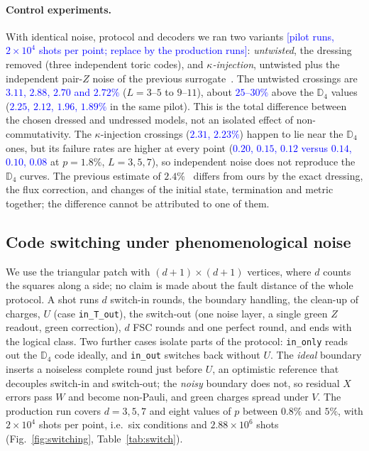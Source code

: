 \documentclass[a4paper]{article}
\newcommand{\blue}[1]{\textcolor{blue}{#1}}
\newcommand{\cs}[1]{\texttt{#1}}
\begin{document}
\paragraph{Control experiments.}
With identical noise, protocol and decoders we ran two variants \blue{[pilot runs, $2\times10^4$ shots per point; replace by the production runs]}: \emph{untwisted}, the dressing removed (three independent toric codes), and \emph{$\kappa$-injection}, untwisted plus the independent pair-$Z$ noise of the previous surrogate~\cite{haga2026aqis}. The untwisted crossings are \blue{$3.11$, $2.88$, $2.70$ and $2.72\%$} ($L=3$--$5$ to $9$--$11$), about \blue{$25$--$30\%$} above the $\mathbb{D}_4$ values (\blue{$2.25$, $2.12$, $1.96$, $1.89\%$} in the same pilot). This is the total difference between the chosen dressed and undressed models, not an isolated effect of non-commutativity. The $\kappa$-injection crossings (\blue{$2.31$, $2.23\%$}) happen to lie near the $\mathbb{D}_4$ ones, but its failure rates are higher at every point (\blue{$0.20$, $0.15$, $0.12$ versus $0.14$, $0.10$, $0.08$} at $p=1.8\%$, $L=3,5,7$), so independent noise does not reproduce the $\mathbb{D}_4$ curves. The previous estimate of $2.4\%$~\cite{haga2026aqis} differs from ours by the exact dressing, the flux correction, and changes of the initial state, termination and metric together; the difference cannot be attributed to one of them.

\subsection{Code switching under phenomenological noise}
\label{sec:res2}

We use the triangular patch with $(d+1)\times(d+1)$ vertices, where $d$ counts the squares along a side; no claim is made about the fault distance of the whole protocol. A shot runs $d$ switch-in rounds, the boundary handling, the clean-up of charges, $U$ (case \cs{in\_T\_out}), the switch-out (one noise layer, a single green $Z$ readout, green correction), $d$ FSC rounds and one perfect round, and ends with the logical class. Two further cases isolate parts of the protocol: \cs{in\_only} reads out the $\mathbb{D}_4$ code ideally, and \cs{in\_out} switches back without $U$. The \emph{ideal} boundary inserts a noiseless complete round just before $U$, an optimistic reference that decouples switch-in and switch-out; the \emph{noisy} boundary does not, so residual $X$ errors pass $W$ and become non-Pauli, and green charges spread under $V$. The production run covers $d=3,5,7$ and eight values of $p$ between $0.8\%$ and $5\%$, with $2\times10^4$ shots per point, i.e.\ six conditions and $2.88\times10^6$ shots (Fig.~\ref{fig:switching}, Table~\ref{tab:switch}).
\end{document}
